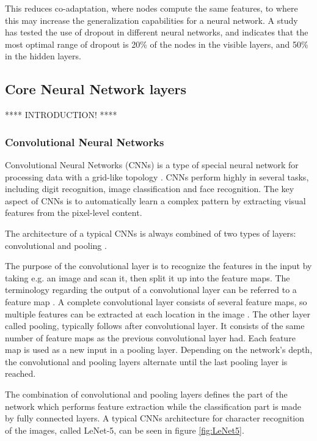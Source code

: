 \noindent
This reduces co-adaptation, where nodes compute the same features, to where this may increase the generalization capabilities for a neural network. 
A study \citeauthor{Srivastava2014} has tested the use of dropout in different neural networks, and indicates that the most optimal range of dropout is 20\% of the nodes in the visible layers, and 50\% in the hidden layers.\citep{Srivastava2014}

\subsection{Core Neural Network layers}
**** INTRODUCTION! ****

\subsubsection{Convolutional Neural Networks}
Convolutional Neural Networks (CNNs) is a type of special neural network for processing data with a grid-like topology \citep{Goodfellow2016}. CNNs perform highly in several tasks, including digit recognition, image classification and face recognition. The key aspect of CNNs is to automatically learn a complex pattern by extracting visual features from the pixel-level content.\citep{Acquarelli2017,LeCun1998}

\noindent
The architecture of a typical CNNs is always combined of two types of layers: convolutional and pooling \citep{Goodfellow2016, LeCun2015}. 

\noindent
The purpose of the convolutional layer is to recognize the features in the input by taking e.g. an image and scan it, then split it up into the feature maps. The terminology regarding the output of a convolutional layer can be referred to a feature map \citep{Goodfellow2016,LeCun1998}. A complete convolutional layer consists of several feature maps, so multiple features can be extracted at each location in the image \citep{LeCun1998}. 
The other layer called pooling, typically follows after convolutional layer. It consists of the same number of feature maps as the previous convolutional layer had. Each feature map is used as a new input in a pooling layer. Depending on the network's depth, the convolutional and pooling layers alternate until the last pooling layer is reached.\citep{LeCun1998}

\noindent
The combination of convolutional and pooling layers defines the part of the network which performs feature extraction while the classification part is made by fully connected layers. 
\noindent
A typical CNNs architecture for character recognition of the images, called LeNet-5, can be seen in figure \ref{fig:LeNet5}.


